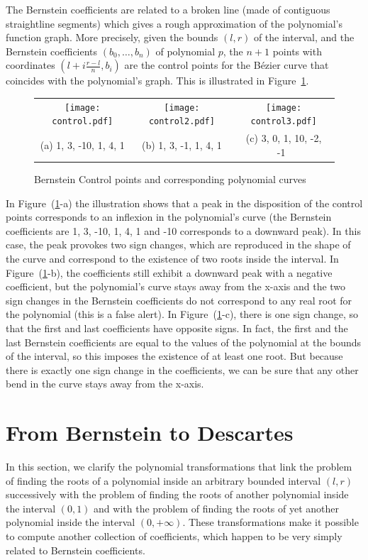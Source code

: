 \documentclass{mscs}
\begin{document}
\label{sec:geometrybernstein}
The Bernstein coefficients are related to a broken line (made of
contiguous straightline segments) which gives a rough approximation of the
polynomial's function graph.  More precisely, given the bounds \((l,r)\)
of the interval, and the Bernstein coefficients \((b_0,\ldots, b_n)\)
of polynomial $p$, the $n+1$ points with coordinates \((l + i
\frac{r-l}{n}, b_i)\) are the control points for the B\'ezier curve
that coincides with the polynomial's graph. This is illustrated in Figure~\ref{control}.
\begin{figure}
\begin{center}
\begin{tabular}{ccc}
\texttt{[image: control.pdf]}&
\texttt{[image: control2.pdf]}&
\texttt{[image: control3.pdf]}\\
(a) 1, 3, -10, 1, 4, 1 & (b) 1, 3, -1, 1, 4, 1 & (c) 3, 0, 1, 10, -2, -1\
\end{tabular}
\end{center}
\caption{\label{control} Bernstein Control points and corresponding polynomial curves}
\end{figure}

In Figure~{(\ref{control}-a)} the illustration shows that a peak in
the disposition of the control points corresponds to an inflexion in the
polynomial's curve (the Bernstein coefficients are 1, 3, -10, 1, 4, 1
and -10 corresponds to a downward peak).  In this case, the peak
provokes two sign changes, which are reproduced in the shape of the
curve and correspond to the existence of two roots inside the
interval.  In Figure~(\ref{control}-b), the coefficients still exhibit
a downward peak with a negative coefficient, but the polynomial's
curve stays away from the x-axis and the two sign changes in the
Bernstein coefficients do not correspond to any real root for the
polynomial (this is a false alert).  In Figure~(\ref{control}-c),
there is one sign change, so that the first and last coefficients have
opposite signs.  In fact, the first and the last Bernstein
coefficients are equal to the values of the polynomial at the bounds
of the interval, so this imposes the existence of at least one root.
But because there is exactly one sign change in the coefficients, we
can be sure that any other bend in the curve stays away from the x-axis.


\section{From Bernstein to Descartes}\label{sec:Bernstein}
In this section, we clarify the polynomial transformations that link
the problem of finding the roots of a polynomial inside an arbitrary
bounded interval \((l,r)\) successively with the problem of finding
the roots of another polynomial inside the interval \((0,1)\) and
with the problem of finding the roots of yet another polynomial inside
the interval \((0,+\infty)\).  These transformations make it possible to
compute another collection of coefficients, which happen to be very simply
related to Bernstein coefficients.
\end{document}
